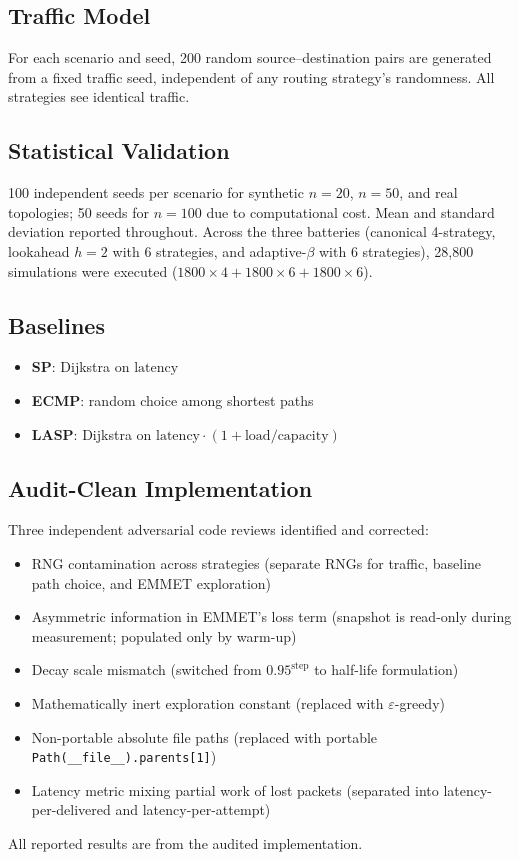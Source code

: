 \documentclass[11pt,a4paper]{article}
\begin{document}
\subsection{Traffic Model}

For each scenario and seed, 200 random source--destination pairs are
generated from a fixed traffic seed, independent of any routing
strategy's randomness. All strategies see identical traffic.

\subsection{Statistical Validation}

100 independent seeds per scenario for synthetic $n{=}20$, $n{=}50$,
and real topologies; 50 seeds for $n{=}100$ due to computational cost.
Mean and standard deviation reported throughout. Across the three
batteries (canonical 4-strategy, lookahead $h{=}2$ with 6 strategies,
and adaptive-$\beta$ with 6 strategies), 28{,}800 simulations were
executed ($1800 \times 4 + 1800 \times 6 + 1800 \times 6$).

\subsection{Baselines}

\begin{itemize}[itemsep=1pt]
  \item \textbf{SP}: Dijkstra on $\mathrm{latency}$
  \item \textbf{ECMP}: random choice among shortest
        paths~\cite{rfc2992}
  \item \textbf{LASP}: Dijkstra on
        $\mathrm{latency} \cdot (1 + \mathrm{load}/\mathrm{capacity})$
\end{itemize}

\subsection{Audit-Clean Implementation}

Three independent adversarial code reviews identified and corrected:
\begin{itemize}[itemsep=1pt]
  \item RNG contamination across strategies (separate RNGs for
        traffic, baseline path choice, and EMMET exploration)
  \item Asymmetric information in EMMET's loss term (snapshot is
        read-only during measurement; populated only by warm-up)
  \item Decay scale mismatch (switched from $0.95^{\mathrm{step}}$ to
        half-life formulation)
  \item Mathematically inert exploration constant (replaced with
        $\varepsilon$-greedy)
  \item Non-portable absolute file paths (replaced with portable
        \texttt{Path(\_\_file\_\_).parents[1]})
  \item Latency metric mixing partial work of lost packets (separated
        into latency-per-delivered and latency-per-attempt)
\end{itemize}
All reported results are from the audited implementation.
\end{document}
